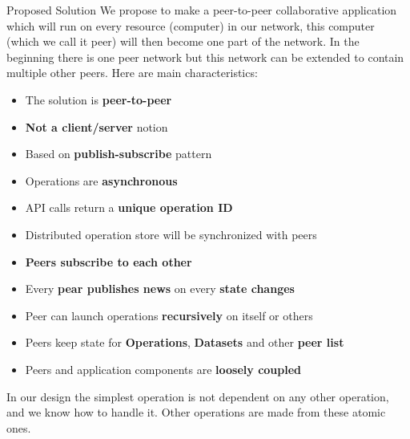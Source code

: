 \documentclass[final,hyperref={pdfpagelabels=true}]{beamer}
\begin{document}
\begin{frame}
\begin{columns}[t]
\begin{column}{.45\textwidth}
\begin{block}{Proposed Solution}
      We propose to make a peer-to-peer collaborative application which will run on every resource 
      (computer) in our network, this computer (which we call it peer) will then become one part of 
      the network. In the beginning there is one peer network but this network can be extended to contain
      multiple other peers. Here are main characteristics:
      \begin{itemize}
      \item The solution is \textbf{peer-to-peer}
      \item \textbf{Not a client/server} notion
      \item Based on \textbf{publish-subscribe} pattern
      \item Operations are \textbf{asynchronous}
      \item API calls return a \textbf{unique operation ID}
      \item Distributed operation store will be synchronized with peers
      \item \textbf{Peers subscribe to each other}
      \item Every \textbf{pear publishes news} on every \textbf{state changes}
      \item Peer can launch operations \textbf{recursively} on itself or others
      \item Peers keep state for \textbf{Operations}, \textbf{Datasets} and other \textbf{peer list}
      \item Peers and application components are \textbf{loosely coupled}
      \end{itemize}
      
      In our design the simplest operation is not dependent on any other operation, and we know how to handle it. Other operations are made from these atomic ones.
      
      \end{block}


\end{column}
\end{columns}
\end{frame}
\end{document}
